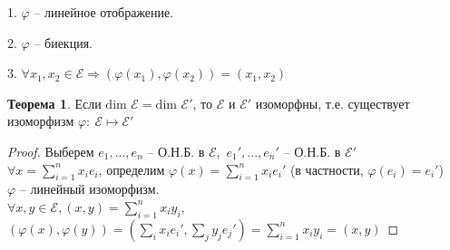 \documentclass[a4paper, 12pt]{article}
\theoremstyle{definition}
\newtheorem*{theorem}{Теорема}
\begin{document}
    1. $\varphi$ -- линейное отображение.
    
    2. $\varphi$ -- биекция.
    
    3. $\forall x_1,x_2 \in \mathcal{E} \Longrightarrow 
    (\varphi(x_1), \varphi(x_2)) = (x_1, x_2)$ 

    \begin{theorem}
        Если $\text{dim }\mathcal{E} = \text{dim }\mathcal{E}
        '$, то $\mathcal{E}$ и $\mathcal{E}'$ изоморфны,
        т.е. существует изоморфизм $\varphi:\ \mathcal{E}
        \longmapsto \mathcal{E}'$   
    \end{theorem}
    \begin{proof}
        Выберем $e_1,...,e_n$ -- О.Н.Б. в $\mathcal{E}$,\
        $e_1',...,e_n'$ -- О.Н.Б. в $\mathcal{E}'$\\
        $\forall x = \sum\limits_{i=1}^{n} x_ie_i$, определим
        $\varphi(x) = \sum\limits_{i=1}^{n} x_ie_i'$
        (в частности, $\varphi(e_i) = e_i'$)\\
        $\varphi$ -- линейный изоморфизм.\\
        $\forall x,y \in \mathcal{E}, (x,y) = \sum\limits_{i=1}^
        {n} x_iy_i$,\ \ $(\varphi(x), \varphi(y)) = 
        (\sum\limits_{i} x_ie_i', \sum\limits_{j}y_je_j') = 
        \sum\limits_{i=1}^{n} x_iy_i = (x,y)$  

    \end{proof}
\end{document}
